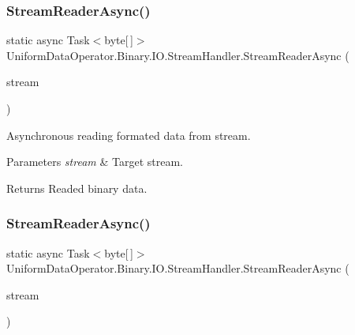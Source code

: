 \subsubsection{\texorpdfstring{Stream\+Reader\+Async()}{StreamReaderAsync()}\hspace{0.1cm}{\footnotesize\ttfamily [1/2]}}
{\footnotesize\ttfamily static async Task$<$byte\mbox{[}$\,$\mbox{]}$>$ Uniform\+Data\+Operator.\+Binary.\+I\+O.\+Stream\+Handler.\+Stream\+Reader\+Async (\begin{DoxyParamCaption}\item[{Pipe\+Stream}]{stream }\end{DoxyParamCaption})\hspace{0.3cm}{\ttfamily [static]}}



Asynchronous reading formated data from stream. 


\begin{DoxyParams}{Parameters}
{\em stream} & Target stream.\\
\hline
\end{DoxyParams}
\begin{DoxyReturn}{Returns}
Readed binary data.
\end{DoxyReturn}
\mbox{\label{class_uniform_data_operator_1_1_binary_1_1_i_o_1_1_stream_handler_aa001d58762b89cb8fdaa729b53b2a9af}} 
\subsubsection{\texorpdfstring{Stream\+Reader\+Async()}{StreamReaderAsync()}\hspace{0.1cm}{\footnotesize\ttfamily [2/2]}}
{\footnotesize\ttfamily static async Task$<$byte\mbox{[}$\,$\mbox{]}$>$ Uniform\+Data\+Operator.\+Binary.\+I\+O.\+Stream\+Handler.\+Stream\+Reader\+Async (\begin{DoxyParamCaption}\item[{Stream}]{stream }\end{DoxyParamCaption})\hspace{0.3cm}{\ttfamily [static]}}




